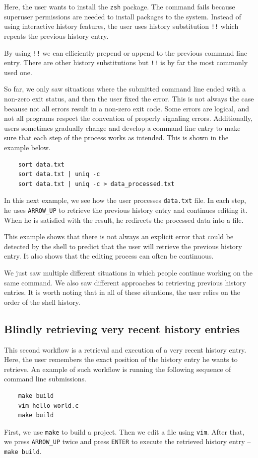 Here, the user wants to install the \verb|zsh| package. The command fails because superuser permissions are needed to install packages to the system. Instead of using interactive history features, the user uses history substitution \verb|!!| which repeats the previous history entry. 

By using \verb|!!| we can efficiently prepend or append to the previous command line entry. There are other history substitutions but \verb|!!| is by far the most commonly used one. 

So far, we only saw situations where the submitted command line ended with a non-zero exit status, and then the user fixed the error. This is not always the case because not all errors result in a non-zero exit code. Some errors are logical, and not all programs respect the convention of properly signaling errors. Additionally, users sometimes gradually change and develop a command line entry to make sure that each step of the process works as intended. This is shown in the example below.

\begin{verbatim}
    sort data.txt
    sort data.txt | uniq -c
    sort data.txt | uniq -c > data_processed.txt
\end{verbatim}

In this next example, we see how the user processes \verb|data.txt| file. In each step, he uses \verb|ARROW_UP| to retrieve the previous history entry and continues editing it. When he is satisfied with the result, he redirects the processed data into a file. 

This example shows that there is not always an explicit error that could be detected by the shell to predict that the user will retrieve the previous history entry. It also shows that the editing process can often be continuous.

We just saw multiple different situations in which people continue working on the same command. We also saw different approaches to retrieving previous history entries. It is worth noting that in all of these situations, the user relies on the order of the shell history. 

\subsection{Blindly retrieving very recent history entries}\label{workflow-blind-retrieval}

This second workflow is a retrieval and execution of a very recent history entry. Here, the user remembers the exact position of the history entry he wants to retrieve. An example of such workflow is running the following sequence of command line submissions.
\begin{verbatim}
    make build
    vim hello_world.c
    make build
\end{verbatim}
First, we use \verb|make| to build a project. Then we edit a file using \verb|vim|. After that, we press \verb|ARROW_UP| twice and press \verb|ENTER| to execute the retrieved history entry -- \verb|make build|. 


